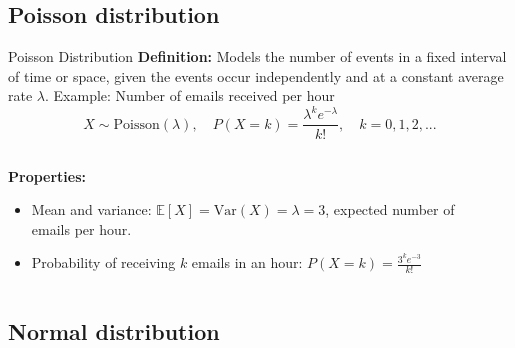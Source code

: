 \documentclass{beamer}
\begin{document}
\subsection{Poisson distribution}
\begin{frame}{Poisson Distribution}
  \textbf{Definition:} Models the number of events in a fixed interval of time or space, given the events occur independently and at a constant average rate \(\lambda\). Example: Number of emails received per hour
  \vspace{0.5em}
  \[
    X \sim \text{Poisson}(\lambda), \quad P(X=k) = \frac{\lambda^k e^{-\lambda}}{k!}, \quad k = 0,1,2,...
  \]

  \begin{columns}[T] %
    \begin{column}{0.48\textwidth}
      \textbf{Properties:}
      \begin{itemize}
      \item Mean and variance: \( \mathbb{E}[X] = \mathrm{Var}(X) = \lambda = 3 \), expected number of emails per hour.
      \item Probability of receiving \(k\) emails in an hour:
        \(
        P(X=k) = \frac{3^k e^{-3}}{k!}
        \)
      \end{itemize}
    \end{column}

    \begin{column}{0.48\textwidth}
    \end{column}
  \end{columns}

\end{frame}


\subsection{Normal distribution}
\end{document}
